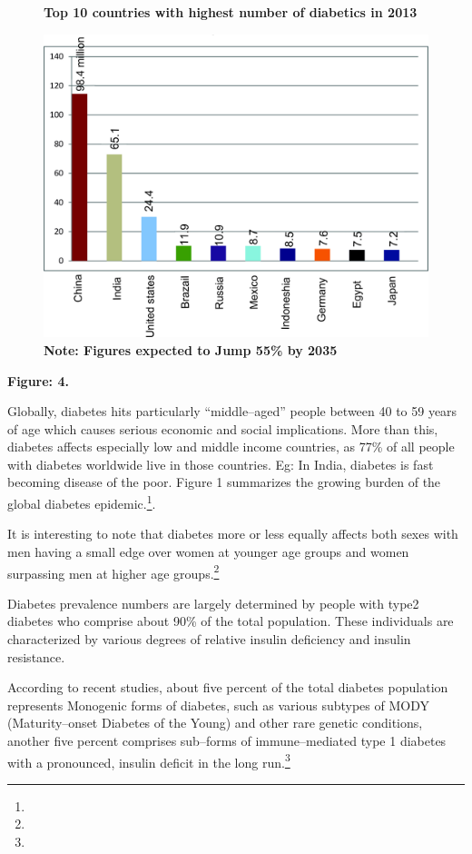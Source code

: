 \begin{figure}
\caption{\textbf{Top 10 countries with highest number of diabetics in 2013}}
\includegraphics{images/037.jpg}
\caption{\textbf{Note: Figures expected to Jump 55\% by 2035}}
\end{figure}

\textbf{Figure: 4.}

Globally, diabetes hits particularly “middle–aged” people between 40 to 59 years of age which causes serious economic and social implications. More than this, diabetes affects especially low and middle income countries, as 77\% of all people with diabetes worldwide live in those countries. Eg: In India, diabetes is fast becoming disease of the poor. Figure 1 summarizes the growing burden of the global diabetes epidemic.\footnote{}.

It is interesting to note that diabetes more or less equally affects both sexes with men having a small edge over women at younger age groups and women surpassing men at higher age groups.\footnote{}

Diabetes prevalence numbers are largely determined by people with type2 diabetes who comprise about 90\% of the total population. These individuals are characterized by various degrees of relative insulin deficiency and insulin resistance.

According to recent studies, about five percent of the total diabetes population represents Monogenic forms of diabetes, such as various subtypes of MODY (Maturity–onset Diabetes of the Young) and other rare genetic conditions, another five percent comprises sub–forms of immune–mediated type 1 diabetes with a pronounced, insulin deficit in the long run.\footnote{}

